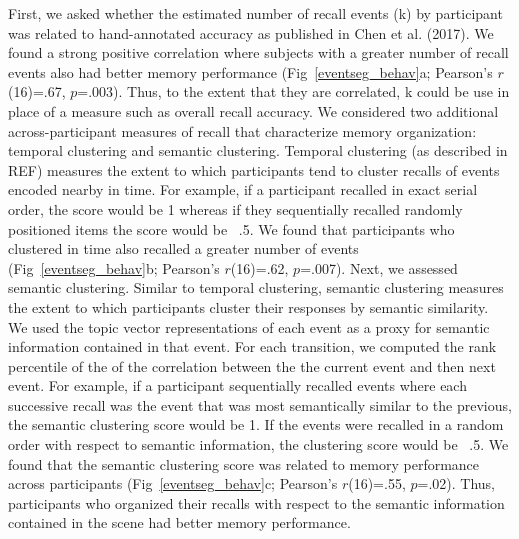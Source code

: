 \documentclass[a4paper,man,natbib,floatsintext]{apa6}
\begin{document}
First, we asked whether the estimated number of recall events (k) by participant was related to hand-annotated accuracy as published in Chen et al. (2017).  We found a strong positive correlation where subjects with a greater number of recall events also had better memory performance (Fig~\ref{eventseg_behav}a; Pearson's $r$(16)=.67, $p$=.003).  Thus, to the extent that they are correlated, k could be use in place of a measure such as overall recall accuracy. We considered two additional across-participant measures of recall that characterize memory organization: temporal clustering and semantic clustering. Temporal clustering (as described in REF) measures the extent to which participants tend to cluster recalls of events encoded nearby in time.  For example, if a participant recalled in exact serial order, the score would be 1 whereas if they sequentially recalled randomly positioned items the score would be ~.5.  We found that participants who clustered in time also recalled a greater number of events (Fig~\ref{eventseg_behav}b; Pearson's $r$(16)=.62, $p$=.007). Next, we assessed semantic clustering.  Similar to temporal clustering, semantic clustering measures the extent to which participants cluster their responses by semantic similarity.  We used the topic vector representations of each event as a proxy for semantic information contained in that event.  For each transition, we computed the rank percentile of the of the correlation between the the current event and then next event. For example, if a participant sequentially recalled events where each successive recall was the event that was most semantically similar to the previous, the semantic clustering score would be 1.  If the events were recalled in a random order with respect to semantic information, the clustering score would be ~.5. We found that the semantic clustering score was related to memory performance across participants (Fig~\ref{eventseg_behav}c; Pearson's $r$(16)=.55, $p$=.02).  Thus, participants who organized their recalls with respect to the semantic information contained in the scene had better memory performance.
\end{document}

